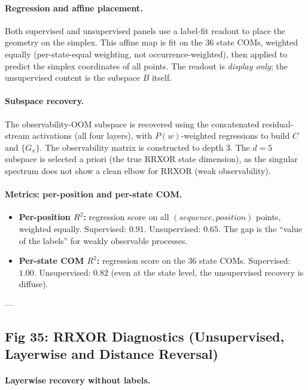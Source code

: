 \documentclass[11pt]{article}
\begin{document}
\paragraph{Regression and affine placement.}

Both supervised and unsupervised panels use a label-fit readout to place the geometry on the simplex. This affine map is fit on the 36 state COMs, weighted equally (per-state-equal weighting, not occurrence-weighted), then applied to predict the simplex coordinates of all points. The readout is \textit{display only}; the unsupervised content is the subspace $B$ itself.

\paragraph{Subspace recovery.}

The observability-OOM subspace is recovered using the concatenated residual-stream activations (all four layers), with $P(w)$-weighted regressions to build $C$ and $\{G_x\}$. The observability matrix is constructed to depth 3. The $d=5$ subspace is selected a priori (the true RRXOR state dimension), as the singular spectrum does not show a clean elbow for RRXOR (weak observability).

\paragraph{Metrics: per-position and per-state COM.}

\begin{itemize}
\item \textbf{Per-position $R^2$:} regression score on all $(sequence, position)$ points, weighted equally. Supervised: $0.91$. Unsupervised: $0.65$. The gap is the ``value of the labels'' for weakly observable processes.
\item \textbf{Per-state COM $R^2$:} regression score on the 36 state COMs. Supervised: $1.00$. Unsupervised: $0.82$ (even at the state level, the unsupervised recovery is diffuse).
\end{itemize}


---

\subsection{Fig 35: RRXOR Diagnostics (Unsupervised, Layerwise and Distance Reversal)}

\paragraph{Layerwise recovery without labels.}
\end{document}
